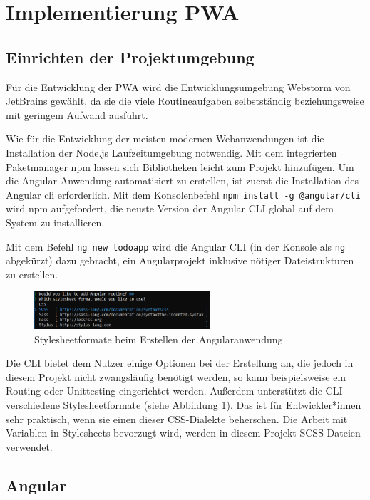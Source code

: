 \newpage
\section{Implementierung PWA}
\subsection{Einrichten der Projektumgebung}
Für die Entwicklung der PWA wird die Entwicklungsumgebung Webstorm von JetBrains gewählt, da sie die viele Routineaufgaben selbstständig beziehungsweise mit geringem Aufwand ausführt.

Wie für die Entwicklung der meisten modernen Webanwendungen ist die Installation der Node.js Laufzeitumgebung notwendig. Mit dem integrierten Paketmanager npm lassen sich Bibliotheken leicht zum Projekt hinzufügen.
Um die Angular Anwendung automatisiert zu erstellen, ist zuerst die Installation des Angular \acf{cli} erforderlich. Mit dem Konsolenbefehl \texttt{npm install -g @angular/cli} wird npm aufgefordert, die neuste Version der Angular CLI global auf dem System zu installieren.


Mit dem Befehl \texttt{ng new todoapp} wird die Angular CLI (in der Konsole als \texttt{ng} abgekürzt) dazu gebracht, ein Angularprojekt inklusive nötiger Dateistrukturen zu erstellen.
\begin{figure}
	\vspace{-10pt}
	\includegraphics[width=0.58\textwidth]{img/angular_cli_css.PNG}
	\caption{Stylesheetformate beim Erstellen der Angularanwendung}
	\label{fig:stylesheet_formate_cli}
	\vspace{-10pt}
\end{figure}
Die CLI bietet dem Nutzer einige Optionen bei der Erstellung an, die jedoch in diesem Projekt nicht zwangsläufig benötigt werden, so kann beispielsweise ein Routing oder Unittesting eingerichtet werden.
Außerdem unterstützt die CLI verschiedene Stylesheetformate (siehe Abbildung \ref{fig:stylesheet_formate_cli}). Das ist für Entwickler*innen sehr praktisch, wenn sie einen dieser CSS-Dialekte beherschen. Die Arbeit mit Variablen in Stylesheets bevorzugt wird, werden in diesem Projekt SCSS Dateien verwendet.


\subsection{Angular}

